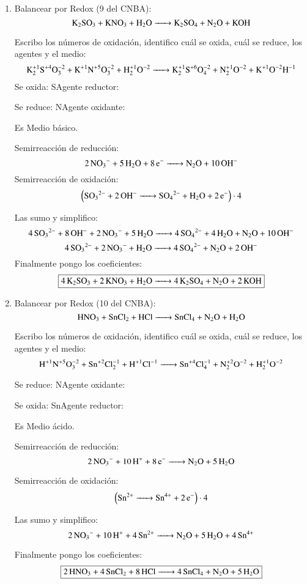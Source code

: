\begin{enumerate}
\item Balancear por Redox (9 del CNBA):
$$\ce{K2SO3 + KNO3 + H2O ->
K2SO4 + N2O + KOH}$$

Escribo los números de oxidación, identifico cuál se oxida, cuál se reduce, los agentes y el medio:
$$\ce{
K^{+1}2S^{+4}O^{-2}3 + K^{+1}N^{+5}O^{-2}3 + H^{+1}2O^{-2} ->
K^{+1}2S^{+6}O^{-2}4 + N^{+1}2O^{-2} + K^{+1}O^{-2}H^{-1}
}$$
\hfil Se oxida: S\hfil Agente reductor: \hfil

\hfil Se reduce: N\hfil Agente oxidante: \hfil

Es Medio básico.

\begin{multicols}{2}
Semirreacción de reducción:
$$\ce{
2NO_3^{-} + 5 H2O + 8e^- ->
N2O + 10OH^-
}$$
Semirreacción de oxidación:
$$\left(\ce{
SO3^{2-} + 2OH^- ->
SO4^{2-} + H2O + 2e^-
}\right)\cdot 4$$
\end{multicols}

Las sumo y simplifico:
$$\ce{
4SO3^{2-} + 8OH^- + 2NO_3^- + 5H2O ->
4SO_4^{2-} + 4 H2O + N2O + 10OH^-
}$$
$$\ce{
4SO3^{2-} + 2NO_3^- + H2O ->
4SO_4^{2-} + N2O + 2OH^-
}$$
Finalmente pongo los coeficientes:
$$\fbox{\ce{4K2SO3 + 2KNO3 + H2O ->
4K2SO4 + N2O + 2KOH}}$$


\newpage
\item
Balancear por Redox (10 del CNBA):
$$\ce{
HNO3 + SnCl2 + HCl ->
SnCl4 + N2O + H2O
}$$

Escribo los números de oxidación, identifico cuál se oxida, cuál se reduce, los agentes y el medio:
$$\ce{
H^{+1}N^{+5}O^{-2}3 + Sn^{+2}Cl^{-1}2 + H^{+1}Cl^{-1} ->
Sn^{+4}Cl^{-1}4 + N^{+2}2O^{-2} + H^{+1}2O^{-2}
}$$

\hfil Se reduce: N\hfil Agente oxidante: \hfil

\hfil Se oxida: Sn\hfil Agente reductor: \hfil

Es Medio ácido.

\begin{multicols}{2}
Semirreacción de reducción:
$$\ce{
2NO_3^- +10H^+ + 8e^- ->
N2O + 5H2O
}$$

Semirreacción de oxidación:
$$\left(\ce{
Sn^{2+} ->
Sn^{4+} + 2e^-
}\right)\cdot 4$$
\end{multicols}

Las sumo y simplifico:
$$\ce{
2NO_3^- + 10H^+ + 4Sn^{2+} ->
N2O + 5H2O + 4Sn^{4+}
}$$

Finalmente pongo los coeficientes:
$$\fbox{\ce{
2HNO3 + 4SnCl2 + 8HCl ->
4SnCl4 + N2O + 5H2O
}}$$



\end{enumerate}
